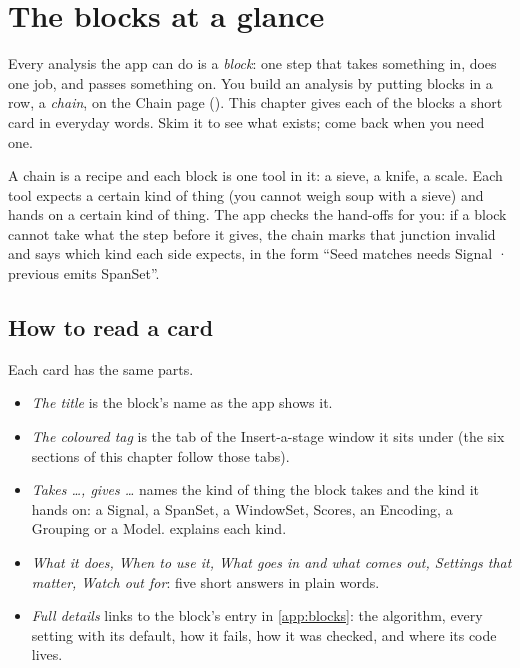 \chapter{The blocks at a glance}\label{ch:blocks}

Every analysis the app can do is a \emph{block}: one step that takes something in, does
one job, and passes something on. You build an analysis by putting blocks in a row, a
\emph{chain}, on the Chain page (). This chapter gives each of the
\ubnumblocks{} blocks a short card in everyday words. Skim it to see what exists; come back
when you need one.

\begin{plainterms}
A chain is a recipe and each block is one tool in it: a sieve, a knife, a scale. Each tool
expects a certain kind of thing (you cannot weigh soup with a sieve) and hands on a certain
kind of thing. The app checks the hand-offs for you: if a block cannot take what the step
before it gives, the chain marks that junction invalid and says which kind each side expects,
in the form ``Seed matches needs Signal · previous emits SpanSet''.
\end{plainterms}

\section*{How to read a card}
Each card has the same parts.
\begin{itemize}
\item \emph{The title} is the block's name as the app shows it.
\item \emph{The coloured tag} is the tab of the Insert-a-stage window it sits under (the six
  sections of this chapter follow those tabs).
\item \emph{Takes \ldots, gives \ldots} names the kind of thing the block takes and the kind
  it hands on: a Signal, a SpanSet, a WindowSet, Scores, an Encoding, a Grouping or a Model.
   explains each kind.
\item \emph{What it does, When to use it, What goes in and what comes out, Settings that
  matter, Watch out for}: five short answers in plain words.
\item \emph{Full details} links to the block's entry in \cref{app:blocks}: the algorithm,
  every setting with its default, how it fails, how it was checked, and where its code lives.
\end{itemize}

